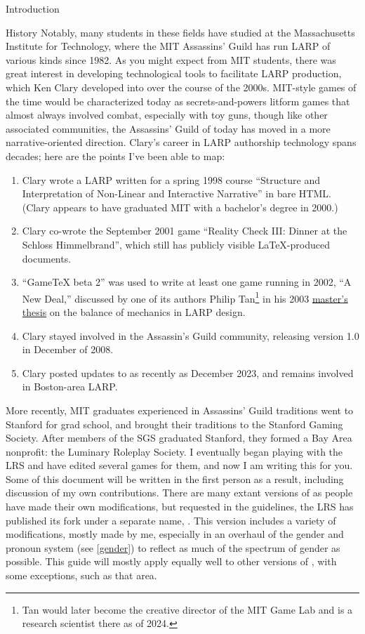 \documentclass[sheet]{GameTexBase}
\begin{document}
\begin{section}{Introduction}
\begin{subsection}{History}
Notably, many students in these fields have studied at the Massachusetts Institute for Technology, where the MIT Assassins' Guild has run LARP of various kinds since 1982.
As you might expect from MIT students, there was great interest in developing technological tools to facilitate LARP production, which Ken Clary developed into \gametex{} over the course of the 2000s.
MIT-style games of the time would be characterized today as secrets-and-powers litform games that almost always involved combat, especially with toy guns, though like other associated communities, the Assassins' Guild of today
has moved in a more narrative-oriented direction.
Clary's career in LARP authorship technology spans decades; here are the points I've been able to map:
\begin{enumerate}
\item Clary wrote a LARP written for a spring 1998 course ``Structure and Interpretation of Non-Linear and Interactive Narrative'' in bare HTML.  (Clary appears to have graduated MIT with a bachelor's degree in 2000.)
\item Clary co-wrote the September 2001 game  ``Reality Check III: Dinner at the Schloss Himmelbrand'', which still has publicly visible \LaTeX{}-produced documents.
\item ``GameTeX beta 2'' was used to write at least one game running in 2002, ``A New Deal,'' discussed by one of its authors Philip Tan\footnote{Tan would later become the creative director of the MIT Game Lab and is a research scientist there as of 2024.} in his 2003 \href{https://drive.google.com/file/d/1RiGc2OWtXIPlebHVrixv2IpAbSGAThtd/view?usp=sharing}{master's thesis} on the balance of mechanics in LARP design.
\item Clary stayed involved in the Assassin's Guild community, releasing \gametex{} version 1.0 in December of 2008.
\item Clary posted updates to \gametex{} as recently as December 2023, and remains involved in Boston-area LARP.
\end{enumerate}
More recently, MIT graduates experienced in Assassins' Guild traditions went to Stanford for grad school, and brought their traditions to the Stanford Gaming Society.  After members of the SGS graduated Stanford, they formed a Bay Area nonprofit: the Luminary Roleplay Society.  I eventually began playing with the LRS and have edited several games for them, and now I am writing this for you.  Some of this document will be written in the first person as a result, including discussion of my own contributions.  There are many extant versions of \gametex{} as people have made their own modifications, but requested in the \gametex{} guidelines, the LRS has published its fork under a separate name, \lrstex{}.  This version includes a variety of modifications, mostly made by me, especially in an overhaul of the gender and pronoun system (see \ref{gender}) to reflect as much of the spectrum of gender as possible.  This guide will mostly apply equally well to other versions of \gametex{}, with some exceptions, such as that area.

\end{subsection}
\end{section}
\end{document}
